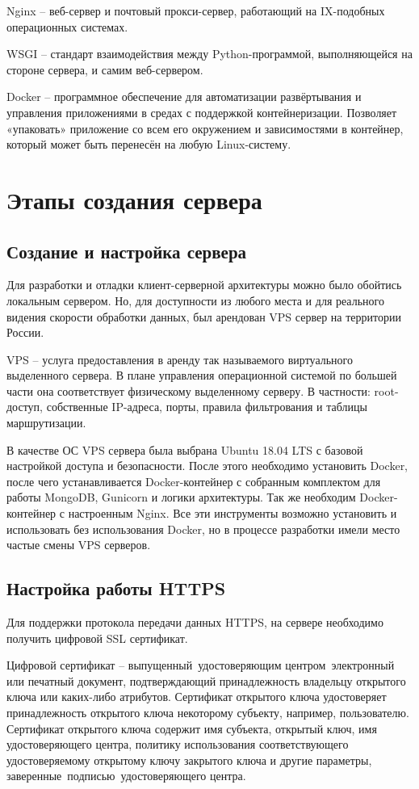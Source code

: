 \documentclass[14pt, a4paper]{extarticle}
\begin{document}
    Nginx – веб-сервер и почтовый прокси-сервер, работающий на IX-подобных операционных системах.

    WSGI – стандарт взаимодействия между Python-программой, выполняющейся на стороне сервера, и самим веб-сервером.

    Docker – программное обеспечение для автоматизации развёртывания и управления приложениями в средах с поддержкой контейнеризации. Позволяет «упаковать» приложение со всем его окружением и зависимостями в контейнер, который может быть перенесён на любую Linux-систему.


    \clearpage
    \section{Этапы создания сервера}
    \subsection{Создание и настройка сервера}
    Для разработки и отладки клиент-серверной архитектуры можно было обойтись локальным сервером. Но, для доступности из любого места и для реального видения скорости обработки данных, был арендован VPS сервер на территории России.

    VPS – услуга предоставления в аренду так называемого виртуального выделенного сервера. В плане управления операционной системой по большей части она соответствует физическому выделенному серверу. В частности: root-доступ, собственные IP-адреса, порты, правила фильтрования и таблицы маршрутизации.

    В качестве ОС VPS сервера была выбрана Ubuntu 18.04 LTS с базовой настройкой доступа и безопасности. После этого необходимо установить Docker, после чего устанавливается Docker-контейнер с собранным комплектом для работы MongoDB, Gunicorn и логики архитектуры. Так же необходим Docker-контейнер с настроенным Nginx. Все эти инструменты возможно установить и использовать без использования Docker, но в процессе разработки имели место частые смены VPS серверов.


    \clearpage
    \subsection{Настройка работы HTTPS}
    Для поддержки протокола передачи данных HTTPS, на сервере необходимо получить цифровой SSL сертификат.

    Цифровой сертификат – выпущенный удостоверяющим центром электронный или печатный документ, подтверждающий принадлежность владельцу открытого ключа или каких-либо атрибутов. Сертификат открытого ключа удостоверяет принадлежность открытого ключа некоторому субъекту, например, пользователю. Сертификат открытого ключа содержит имя субъекта, открытый ключ, имя удостоверяющего центра, политику использования соответствующего удостоверяемому открытому ключу закрытого ключа и другие параметры, заверенные подписью удостоверяющего центра.
\end{document}
